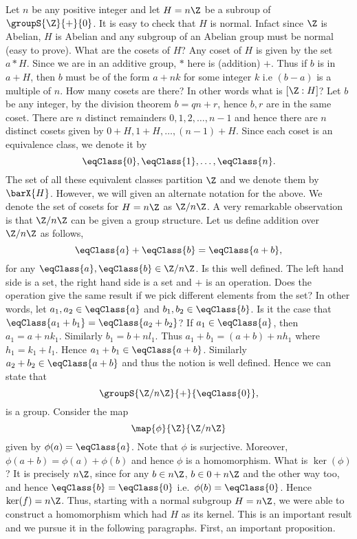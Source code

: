 Let $n$ be any positive integer and let $H = n\Z$ be a subroup of $\groupS{\Z}{+}{0}$. It is easy to check
that $H$ is normal. Infact since $\Z$ is Abelian, $H$ is Abelian and any subgroup of an Abelian group must be
normal (easy to prove). What are the cosets of $H$? Any coset of $H$ is given by the set $a\ast H$. Since we
are in an additive group, $\ast$ here is (addition) $+$. Thus if $b$ is in $a + H$, then $b$ must be of the
form $a + nk$ for some integer $k$ i.e $(b-a)$ is a multiple of $n$. How many cosets are there? In other words
what is $\left[\Z : H\right]$? Let $b$ be any integer, by the division theorem $b = qn + r$, hence $b,r$ are
in the same coset. There are $n$ distinct remainders $0,1,2,\ldots,n-1$ and hence there are $n$ distinct cosets
given by $0 + H, 1+H, \ldots, (n-1) + H$. Since each coset is an equivalence class, we denote it by
\[\eqClass{0},\eqClass{1},\ldots,\eqClass{n}.\]
The set of all these equivalent classes partition $\Z$ and we denote them by $\barX{H}$. However, we will
given an alternate notation for the above. We denote the set of cosets for $H = n\Z$ as $\Z/n\Z$.
A very remarkable observation is that $\Z/n\Z$ can be given a group structure.
Let us define addition over $\Z/n\Z$ as follows,
\[\eqClass{a} + \eqClass{b} = \eqClass{a+b},\]
for any $\eqClass{a},\eqClass{b} \in \Z/n\Z$.
Is this well defined. The left hand side is a set, the right hand side is a set and $+$ is an operation. Does 
the operation give the same result if we pick different elements from the set? In other words, let $a_1,a_2
\in \eqClass{a}$ and $b_1,b_2 \in \eqClass{b}$. Is it the case that $\eqClass{a_1+b_1} = \eqClass{a_2 + b_2}$?
If $a_1 \in \eqClass{a}$, then $a_1 = a + nk_1$. Similarly $b_1 = b + nl_1$. Thus $a_1 + b_1 = (a+b) + nh_1$
where $h_1 = k_1 + l_1$. Hence $a_1 + b_1 \in \eqClass{a+b}$. Similarly $a_2 + b_2 \in \eqClass{a+b}$ and thus
the notion is well defined. Hence we can state that 
\[\groupS{\Z/n\Z}{+}{\eqClass{0}},\]
is a group. Consider the map
\[\map{\phi}{\Z}{\Z/n\Z}\]
given by $\phi(a) = \eqClass{a}$. Note that $\phi$ is surjective. Moreover, $\phi(a + b) = \phi(a) + \phi(b)$
and hence $\phi$ is a homomorphism. What is $\ker(\phi)$? It is precisely $n\Z$, since for any $b \in n\Z$, 
$b \in 0 + n\Z$ and the other way too, and hence $\eqClass{b} = \eqClass{0}$ i.e.~$\phi(b) = \eqClass{0}$.
Hence $\ker(f) = n\Z$. Thus, starting with a normal subgroup $H = n\Z$, we were able to construct a
homomorphism which had $H$ as its kernel. This is an important result and we pursue it in the following
paragraphs. First, an important proposition.

